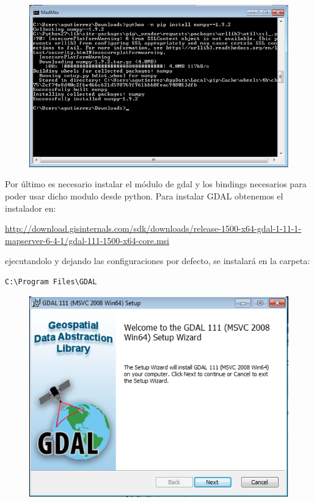 \documentclass[11pt, spanish]{memoir}
\begin{document}
\begin{figure}[H]
\centering
\includegraphics[width=14cm]{numpy.png}
\end{figure}

Por último es necesario instalar el módulo de gdal y los bindings necesarios para poder usar dicho modulo desde python. Para instalar GDAL obtenemos el instalador en:

\url{http://download.gisinternals.com/sdk/downloads/release-1500-x64-gdal-1-11-1-mapserver-6-4-1/gdal-111-1500-x64-core.msi}

ejecutandolo y dejando las configuraciones por defecto, se instalará en la carpeta:

\begin{lstlisting} 
C:\Program Files\GDAL
\end{lstlisting}

\begin{figure}[H]
\centering
\includegraphics[width=14cm]{gdal1.png}
\end{figure}
\end{document}
